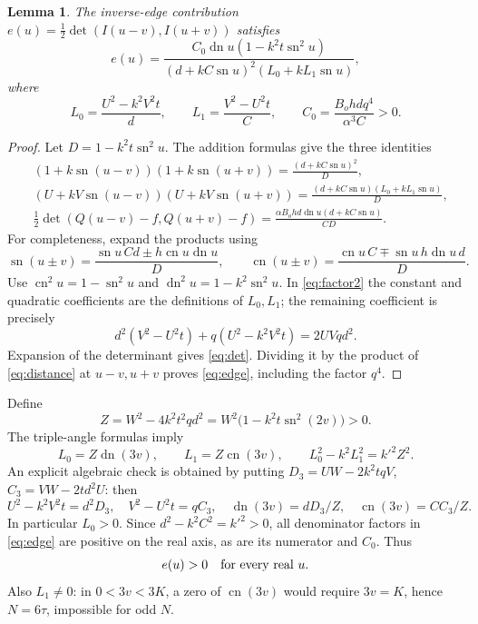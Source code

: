 \documentclass[11pt]{article}
\newtheorem{lemma}{Lemma}
\newcommand{\sn}{\operatorname{sn}}
\newcommand{\cn}{\operatorname{cn}}
\newcommand{\dn}{\operatorname{dn}}
\begin{document}
\begin{lemma}\label{lem:edge}
The inverse-edge contribution $e(u)=\tfrac12\det(I(u-v),I(u+v))$ satisfies
\begin{equation}\label{eq:edge}
 e(u)=\frac{C_0\dn u(1-k^2t\sn^2u)}
 {(d+kC\sn u)^2(L_0+kL_1\sn u)},
\end{equation}
where
\begin{equation}\label{eq:L}
 L_0=\frac{U^2-k^2V^2t}{d},\qquad
 L_1=\frac{V^2-U^2t}{C},\qquad
 C_0=\frac{B_o h d q^4}{\alpha^3 C}>0.
\end{equation}
\end{lemma}
\begin{proof}
Let $D=1-k^2t\sn^2u$. The addition formulas give the three identities
\begin{align}
 &(1+k\sn(u-v))(1+k\sn(u+v))
       =\frac{(d+kC\sn u)^2}{D},\label{eq:factor1}\\
 &(U+kV\sn(u-v))(U+kV\sn(u+v))
       =\frac{(d+kC\sn u)(L_0+kL_1\sn u)}D,\label{eq:factor2}\\
 &\tfrac12\det(Q(u-v)-f,Q(u+v)-f)
       =\frac{\alpha B_o h d\dn u(d+kC\sn u)}{CD}.\label{eq:det}
\end{align}
For completeness, expand the products using
\[
 \sn(u\pm v)=\frac{\sn u\,C d\pm h\cn u\dn u}{D},\qquad
 \cn(u\pm v)=\frac{\cn u\,C\mp\sn u\,h\dn u\,d}{D}.
\]
Use $\cn^2u=1-\sn^2u$ and $\dn^2u=1-k^2\sn^2u$. In \eqref{eq:factor2} the constant and quadratic coefficients are the definitions of $L_0,L_1$; the remaining coefficient is precisely
\[
 d^2(V^2-U^2t)+q(U^2-k^2V^2t)=2UVqd^2.
\]
Expansion of the determinant gives \eqref{eq:det}. Dividing it by the product of \eqref{eq:distance} at $u-v,u+v$ proves \eqref{eq:edge}, including the factor $q^4$.
\end{proof}

Define
\begin{equation}\label{eq:Z}
 Z=W^2-4k^2t^2qd^2=W^2\bigl(1-k^2t\sn^2(2v)\bigr)>0.
\end{equation}
The triple-angle formulas imply
\begin{equation}\label{eq:triple}
 L_0=Z\dn(3v),\qquad L_1=Z\cn(3v),\qquad
 L_0^2-k^2L_1^2=k'^2Z^2.
\end{equation}
An explicit algebraic check is obtained by putting
$D_3=UW-2k^2tqV$, $C_3=VW-2td^2U$: then
\[
 U^2-k^2V^2t=d^2D_3,\quad V^2-U^2t=qC_3,\quad
 \dn(3v)=dD_3/Z,\quad\cn(3v)=CC_3/Z.
\]
In particular $L_0>0$. Since $d^2-k^2C^2=k'^2>0$, all denominator factors in \eqref{eq:edge} are positive on the real axis, as are its numerator and $C_0$. Thus
\begin{equation}\label{eq:positive}
 e(u)>0\quad\hbox{for every real }u.
\end{equation}
Also $L_1\ne0$: in $0<3v<3K$, a zero of $\cn(3v)$ would require $3v=K$, hence $N=6\tau$, impossible for odd $N$.
\end{document}
